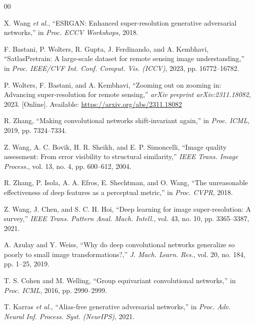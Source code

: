 \documentclass[conference]{IEEEtran}
\begin{document}
\begin{thebibliography}{00}

X. Wang \textit{et al.}, ``ESRGAN: Enhanced super-resolution generative adversarial
networks,'' in \textit{Proc. ECCV Workshops}, 2018.

F. Bastani, P. Wolters, R. Gupta, J. Ferdinando, and A. Kembhavi, ``SatlasPretrain: A
large-scale dataset for remote sensing image understanding,'' in \textit{Proc. IEEE/CVF
Int. Conf. Comput. Vis. (ICCV)}, 2023, pp. 16772--16782.

P. Wolters, F. Bastani, and A. Kembhavi, ``Zooming out on zooming in: Advancing
super-resolution for remote sensing,'' \textit{arXiv preprint arXiv:2311.18082}, 2023.
[Online]. Available: \url{https://arxiv.org/abs/2311.18082}

R. Zhang, ``Making convolutional networks shift-invariant again,'' in
\textit{Proc. ICML}, 2019, pp. 7324--7334.

Z. Wang, A. C. Bovik, H. R. Sheikh, and E. P. Simoncelli, ``Image quality assessment:
From error visibility to structural similarity,'' \textit{IEEE Trans. Image Process.},
vol. 13, no. 4, pp. 600--612, 2004.

R. Zhang, P. Isola, A. A. Efros, E. Shechtman, and O. Wang, ``The unreasonable
effectiveness of deep features as a perceptual metric,'' in \textit{Proc. CVPR}, 2018.

Z. Wang, J. Chen, and S. C. H. Hoi, ``Deep learning for image super-resolution: A
survey,'' \textit{IEEE Trans. Pattern Anal. Mach. Intell.}, vol. 43, no. 10,
pp. 3365--3387, 2021.

A. Azulay and Y. Weiss, ``Why do deep convolutional networks generalize so poorly to
small image transformations?,'' \textit{J. Mach. Learn. Res.}, vol. 20, no. 184,
pp. 1--25, 2019.

T. S. Cohen and M. Welling, ``Group equivariant convolutional networks,'' in
\textit{Proc. ICML}, 2016, pp. 2990--2999.

T. Karras \textit{et al.}, ``Alias-free generative adversarial networks,'' in
\textit{Proc. Adv. Neural Inf. Process. Syst. (NeurIPS)}, 2021.

\end{thebibliography}
\end{document}
